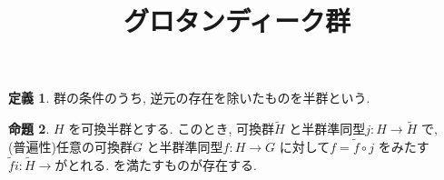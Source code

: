 \documentclass[10pt, fleqn, label-section=none]{bxjsarticle}
\title{グロタンディーク群}
\date{}
\author{}
\theoremstyle{definition}
\newtheorem{dfn}{定義}[section]
\newtheorem{prop}[dfn]{命題}
\renewcommand{\;}{\, ; \,}
\begin{document}
\maketitle



\section{}

\begin{dfn}
群の条件のうち, 逆元の存在を除いたものを半群という. 
\end{dfn}

\begin{prop}
$H$ を可換半群とする. このとき, 可換群$\tilde H$ と半群準同型$j: H \rightarrow \tilde H$ で, \\
(普遍性)任意の可換群$G$ と半群準同型$f: H \rightarrow G$ に対して$f = \tilde f \circ j$ をみたす$\tilde fi : \tilde H \rightarrow $がとれる.
を満たすものが存在する.
\end{prop}
\end{document}
